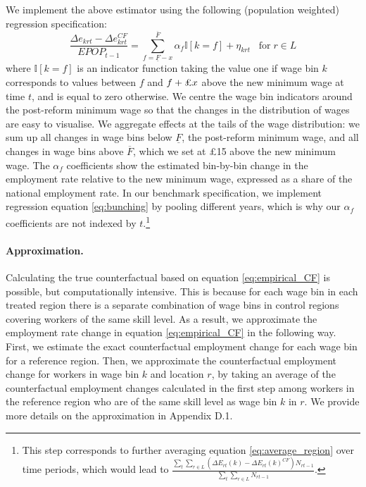 We implement the above estimator using the following (population weighted) regression specification:
\begin{equation}\label{eq:bunching}
    \dfrac{\Delta e_{krt} - \Delta e_{krt}^{CF}}{EPOP_{t-1}} = \sum_{f=\underline{F}-x}^{\overline{F}} \alpha_f \mathbb{I}[k=f]+\eta_{krt} \; \; \; \text{for}  \; r \in L
\end{equation}
where $\mathbb{I}[k=f]$ is an indicator function taking the value one if wage bin $k$ corresponds to values between $f$ and $f+\text{\pounds}x$ above the new minimum wage at time $t$, and is equal to zero otherwise. We centre the wage bin indicators around the post-reform minimum wage so that the changes in the distribution of wages are easy to visualise. We aggregate effects at the tails of the wage distribution: we sum up all changes in wage bins below $\underline{F}$, the post-reform minimum wage, and all changes in wage bins above $\overline{F}$, which we set at \pounds 15 above the new minimum wage. The $\alpha_f$ coefficients show the estimated bin-by-bin change in the employment rate relative to the new minimum wage, expressed as a share of the national employment rate. In our benchmark specification, we implement regression equation \ref{eq:bunching} by pooling different years, which is why our $\alpha_f$ coefficients are not indexed by $t$.\footnote{This step corresponds to further averaging equation \ref{eq:average_region} over time periods, which would lead to ${\frac{\sum_{t}\sum_{r\in L}(\Delta E_{rt}(k) - \Delta E_{rt}(k)^{CF})N_{rt-1}}{\sum_{t}\sum_{r\in L}N_{rt-1}}}$.} 

\paragraph{Approximation.} Calculating the true counterfactual based on equation \ref{eq:empirical_CF} is possible, but computationally intensive. This is because for each wage bin in each treated region there is a separate combination of wage bins in control regions covering workers of the same skill level. As a result, we approximate the employment rate change in equation \ref{eq:empirical_CF} in the following way. First, we estimate the exact counterfactual employment change for each wage bin for a reference region. Then, we approximate the counterfactual employment change for workers in wage bin $k$ and location $r$, by taking an average of the counterfactual employment changes calculated in the first step among workers in the reference region who are of the same skill level as wage bin $k$ in $r$. We provide more details on the approximation in Appendix D.1.


